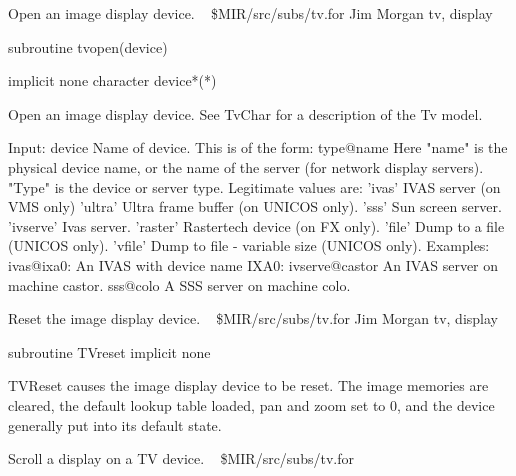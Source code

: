 %
\noindent Open an image display device.
\newline \ 
\newline {} \$MIR/src/subs/tv.for
\newline {} Jim Morgan
\newline {} tv, display
\par{\tenpoint
{\eightpoint\begintt
        subroutine tvopen(device)

        implicit none
        character device*(*)

  Open an image display device. See TvChar for a description of the
  Tv model.

  Input:
    device     Name of device. This is of the form:
                 type@name
               Here "name" is the physical device name, or the
               name of the server (for network display servers). "Type"
               is the device or server type. Legitimate values are:
                 'ivas'        IVAS server (on VMS only)
                 'ultra'       Ultra frame buffer (on UNICOS only).
                 'sss'         Sun screen server.
                 'ivserve'     Ivas server.
                 'raster'      Rastertech device (on FX only).
                 'file'        Dump to a file (UNICOS only).
                 'vfile'       Dump to file - variable size (UNICOS only).
               Examples:
                 ivas@ixa0:    An IVAS with device name IXA0:
                 ivserve@castor  An IVAS server on machine castor.
                 sss@colo      A SSS server on machine colo.
\endtt}
\par}
%
\noindent Reset the image display device.
\newline \ 
\newline {} \$MIR/src/subs/tv.for
\newline {} Jim Morgan
\newline \abox{Keywords:} tv, display
\par{\tenpoint
{\eightpoint\begintt
        subroutine TVreset
        implicit none

  TVReset causes the image display device to be reset. The image memories
  are cleared, the default lookup table loaded, pan and zoom set to
  0, and the device generally put into its default state.
\endtt}
\par}
%
\noindent Scroll a display on a TV device.
\newline \ 
\newline {} \$MIR/src/subs/tv.for

